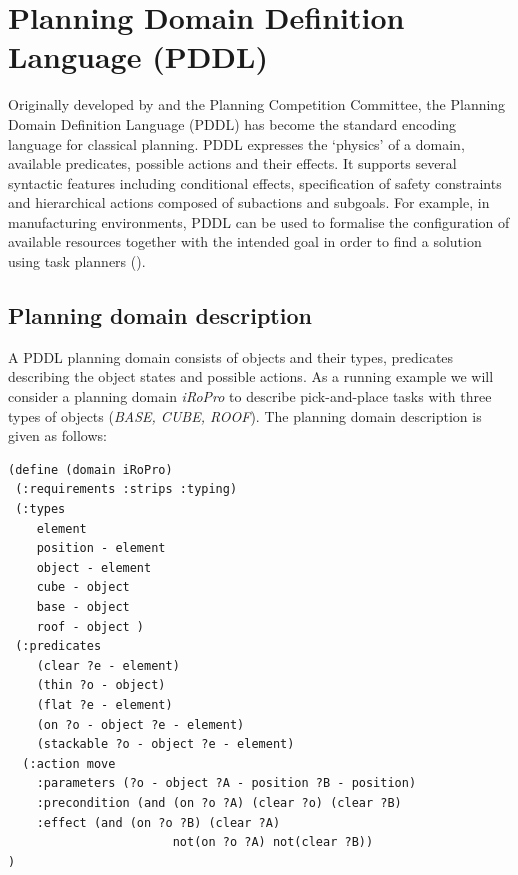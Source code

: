 \section{Planning Domain Definition Language (PDDL)}\label{subsec:PDDL}
Originally developed by \cite{mcdermott1998pddl} and the Planning Competition Committee, the Planning Domain Definition Language (PDDL) has become the standard encoding language for classical planning. 
PDDL expresses the `physics' of a domain, \ie available predicates, possible actions and their effects.
It supports several syntactic features including conditional effects, specification of safety constraints and hierarchical actions composed of subactions and subgoals. 
For example, in manufacturing environments, PDDL can be used to formalise the configuration of available resources together with the intended goal in order to find a solution using task planners (\cite{huckaby2013planning}). 
%

\subsection{Planning domain description}\label{subsec:Planning domain description}
A PDDL planning domain consists of objects and their types, predicates describing the object states and possible actions. 
As a running example we will consider a planning domain \textit{iRoPro} to describe pick-and-place tasks with three types of objects (\textit{BASE, CUBE, ROOF}).
The planning domain description is given as follows:
\begin{verbatim}
(define (domain iRoPro)
 (:requirements :strips :typing)
 (:types 
    element 
    position - element 
    object - element 
    cube - object 
    base - object 
    roof - object )
 (:predicates
    (clear ?e - element)
    (thin ?o - object)
    (flat ?e - element)
    (on ?o - object ?e - element)
    (stackable ?o - object ?e - element) 
  (:action move
    :parameters (?o - object ?A - position ?B - position)
    :precondition (and (on ?o ?A) (clear ?o) (clear ?B)
    :effect (and (on ?o ?B) (clear ?A)
                       not(on ?o ?A) not(clear ?B))
)
\end{verbatim}

